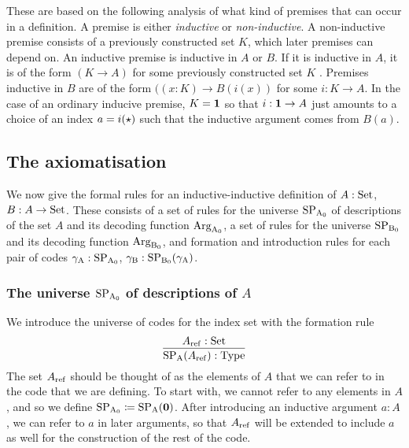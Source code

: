 \documentclass{article}
\begin{document}
These are based on the following analysis of what kind of premises
that can occur in a definition. A premise is either \emph{inductive}
or \emph{non-inductive}. A non-inductive premise consists of a
previously constructed set $K$, which later premises can depend on. An
inductive premise is inductive in $A$ or $B$. If it is inductive in
$A$, it is of the form $(K \to A)$ for some previously constructed set
$K$%
. Premises inductive in $B$ are of the form $((x : K) \to
B(i(x))$ for some $i : K \to A$. In the case of an ordinary inducive
premise, $K = \mathbf{1}$ so that $i : \mathbf{1} \to A$ just amounts to a choice
of an index $a = i(\star)$ such that the inductive argument comes
from $B(a)$.


\subsection{The axiomatisation}
\label{sec:formal-axiomatisation}

We now give the formal rules for an inductive-inductive definition of
$A : \text{Set}$, $B : A \to \text{Set}$. These consists of a set of rules for the
universe $\text{SP}_{\mathrm{A}_0}$ of descriptions of the set $A$ and its decoding
function $\text{Arg}_{\mathrm{A}_0}$, a set of rules for the universe $\text{SP}_{\mathrm{B}_0}$ and its
decoding function $\text{Arg}_{\mathrm{B}_0}$, and formation and introduction rules for
each pair of codes $\gamma_{\mathrm{A}} : \text{SP}_{\mathrm{A}_0}$, $\gamma_{\mathrm{B}} : \text{SP}_{\mathrm{B}_0}(\gamma_{\mathrm{A}})$.

\subsubsection{The universe $\text{SP}_{\mathrm{A}_0}$ of descriptions of $A$}
\label{sec:SPA}
  
We introduce the universe of codes for the index set with the
formation rule
\[
\infer{\SPA(\Aref) : \TYPE}{\Aref : \Set}
\]
The set $A_{\mathrm{ref}}$ should be thought of as the elements of $A$ that we
can refer to in the code that we are defining. To start with, we
cannot refer to any elements in $A$, and so we define $\text{SP}_{\mathrm{A}_0} \coloneqq
\text{SP}_{\mathrm{A}}(\mathbf{0})$. After introducing an inductive argument $a : A$, we can
refer to $a$ in later arguments, so that $A_{\mathrm{ref}}$ will be extended to
include $a$ as well for the construction of the rest of the code.
\end{document}
